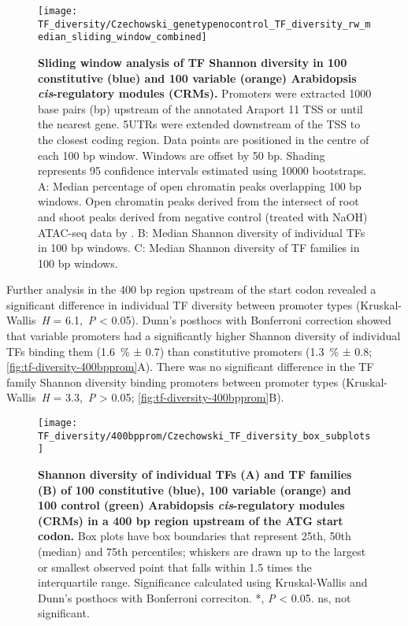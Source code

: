 \documentclass[../main.tex]{subfiles}
\begin{document}
 \begin{figure}[hbt!]
	\begin{center}
		\capstart
		\texttt{[image: TF\_diversity/Czechowski\_genetypenocontrol\_TF\_diversity\_rw\_median\_sliding\_window\_combined]}
		\caption{
			\textbf{Sliding window analysis of TF Shannon diversity in 100 constitutive (blue) and 100 variable (orange) Arabidopsis \textit{cis}\hyp{}regulatory modules (CRMs).}
			Promoters were extracted 1000 base pairs (bp) upstream of the annotated Araport 11 \autocite{chengAraport11CompleteReannotation2017} TSS or until the nearest gene.
			5UTRs were extended downstream of the TSS to the closest coding region.
			Data points are positioned in the centre of each 100 bp window.
			Windows are offset by 50 bp.
			Shading represents 95 confidence intervals estimated using 10000 bootstraps.
			A: Median percentage of open chromatin peaks overlapping 100 bp windows. Open chromatin peaks derived from the intersect of root and shoot peaks derived from negative control (treated with NaOH) ATAC\hyp{}seq data by \textcite{potterCytokininModulatesContextdependent2018}.	
			B: Median Shannon diversity of individual TFs in 100 bp windows.
			C: Median Shannon diversity of TF families in 100 bp windows.
			\label{fig:tf-diversity-sliding-window}
		}
	\end{center}
\end{figure}

Further analysis in the 400 bp region upstream of the start codon revealed a significant difference in individual TF diversity between promoter types (Kruskal\hyp{}Wallis~\textit{H} = 6.1,~\textit{P} \textless{} 0.05).
Dunn's posthocs with Bonferroni correction showed that variable promoters had a significantly higher Shannon diversity of individual TFs binding them (\SI{1.6}{\percent} ± 0.7) than constitutive promoters (\SI{1.3}{\percent} ± 0.8; \autoref{fig:tf-diversity-400bpprom}A).
There was no significant difference in the TF family Shannon diversity binding promoters between promoter types (Kruskal\hyp{}Wallis~\textit{H} = 3.3,~\textit{P} \textgreater{} 0.05; \autoref{fig:tf-diversity-400bpprom}B).


\begin{figure}[hbt!]
	\begin{center}
		\capstart
		\texttt{[image: TF\_diversity/400bpprom/Czechowski\_TF\_diversity\_box\_subplots]}
		\caption{
			\textbf{Shannon diversity of individual TFs (A) and TF families (B) of 100 constitutive (blue), 100 variable (orange) and 100 control (green) Arabidopsis \textit{cis}\hyp{}regulatory modules (CRMs) in a 400 bp region upstream of the ATG start codon.}
			Box plots have box boundaries that represent 25th, 50th (median) and 75th percentiles; whiskers are drawn up to the largest or smallest observed point that falls within 1.5 times the interquartile range.
			\label{fig:tf-diversity-400bpprom}
			Significance calculated using Kruskal\hyp{}Wallis and Dunn's posthocs with Bonferroni correciton.
			*, \textit{P} \textless{} 0.05. ns, not significant.
		}
	\end{center}
\end{figure}
\end{document}
